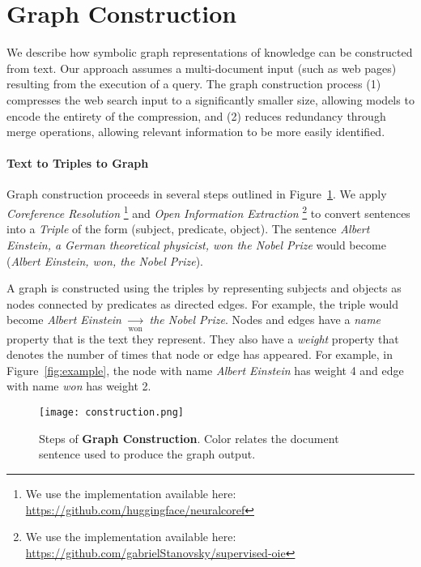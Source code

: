 \documentclass[11pt,a4paper]{article}
\begin{document}
\section{Graph Construction}

We describe how symbolic graph representations of knowledge can be constructed from text. Our approach assumes a multi-document input (such as web pages) resulting from the execution of a query. The graph construction process (1) compresses the web search input to a significantly smaller size, allowing  models to encode the entirety of the compression, and (2) reduces redundancy through merge operations, allowing relevant information to be more easily identified. 

\paragraph{Text to Triples to Graph} Graph construction proceeds in several steps outlined in Figure~\ref{fig:construction}. We apply \textit{Coreference Resolution} \cite{clark2016deep,clark2016improving}\footnote{We use the implementation available here: \url{https://github.com/huggingface/neuralcoref}} and \textit{Open Information Extraction} \cite{stanovsky2018supervised}\footnote{We use the implementation available here: \url{https://github.com/gabrielStanovsky/supervised-oie}} to convert sentences into a \textit{Triple} of the form (subject, predicate, object). The sentence \textit{Albert Einstein, a German theoretical physicist, won the Nobel Prize} would become (\textit{Albert Einstein, won, the Nobel Prize}). 

A graph is constructed using the triples by representing subjects and objects as nodes connected by predicates as directed edges. For example, the triple would become \textit{Albert Einstein} $\xrightarrow[\text{won}]{}$ \textit{the Nobel Prize}. Nodes and edges have a \textit{name} property that is the text they represent. They also have a \textit{weight} property that denotes the number of times that node or edge has appeared. For example, in Figure~\ref{fig:example}, the node with name \textit{Albert Einstein} has weight 4 and edge with name \textit{won} has weight 2. 

\begin{figure}[t!]
    \centering
    \texttt{[image: construction.png]}
    \caption{Steps of \textbf{Graph Construction}. Color relates the document sentence used to produce the graph output.}
    \label{fig:construction}
\end{figure}
\end{document}
